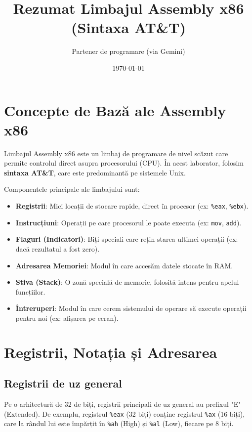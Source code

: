 \documentclass[12pt]{article}
\title{Rezumat Limbajul Assembly x86 (Sintaxa AT\&T)}
\author{Partener de programare (via Gemini)}
\date{\today}
\begin{document}
\maketitle
\tableofcontents
\newpage

\section{Concepte de Bază ale Assembly x86}

Limbajul Assembly x86 este un limbaj de programare de nivel scăzut care permite controlul direct asupra procesorului (CPU). În acest laborator, folosim \textbf{sintaxa AT\&T}, care este predominantă pe sistemele Unix.

Componentele principale ale limbajului sunt:
\begin{itemize}
    \item \textbf{Registrii}: Mici locații de stocare rapide, direct în procesor (ex: \texttt{\%eax}, \texttt{\%ebx}).
    \item \textbf{Instrucțiuni}: Operații pe care procesorul le poate executa (ex: \texttt{mov}, \texttt{add}).
    \item \textbf{Flaguri (Indicatori)}: Biți speciali care rețin starea ultimei operații (ex: dacă rezultatul a fost zero).
    \item \textbf{Adresarea Memoriei}: Modul în care accesăm datele stocate în RAM.
    \item \textbf{Stiva (Stack)}: O zonă specială de memorie, folosită intens pentru apelul funcțiilor.
    \item \textbf{Întreruperi}: Modul în care cerem sistemului de operare să execute operații pentru noi (ex: afișarea pe ecran).
\end{itemize}

\section{Registrii, Notația și Adresarea}

\subsection{Registrii de uz general}
Pe o arhitectură de 32 de biți, registrii principali de uz general au prefixul "E" (Extended). De exemplu, registrul \texttt{\%eax} (32 biți) conține registrul \texttt{\%ax} (16 biți), care la rândul lui este împărțit în \texttt{\%ah} (High) și \texttt{\%al} (Low), fiecare pe 8 biți.
\end{document}
